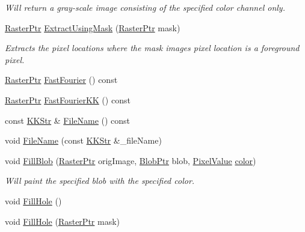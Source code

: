 \begin{DoxyCompactItemize}
\begin{DoxyCompactList}\small\item\em Will return a gray-\/scale image consisting of the specified color channel only. \end{DoxyCompactList}\item 
\hyperlink{class_k_k_b_1_1_raster_aefa532857fd6aa9eb53f79da55a97c5a}{Raster\+Ptr} \hyperlink{class_k_k_b_1_1_raster_a92640499842068eb907e5022ce86fc8c}{Extract\+Using\+Mask} (\hyperlink{class_k_k_b_1_1_raster_aefa532857fd6aa9eb53f79da55a97c5a}{Raster\+Ptr} mask)
\begin{DoxyCompactList}\small\item\em Extracts the pixel locations where the \textquotesingle{}mask\textquotesingle{} images pixel location is a foreground pixel. \end{DoxyCompactList}\item 
\hyperlink{class_k_k_b_1_1_raster_aefa532857fd6aa9eb53f79da55a97c5a}{Raster\+Ptr} \hyperlink{class_k_k_b_1_1_raster_a4a74dade8e36080787196869aec765ac}{Fast\+Fourier} () const 
\item 
\hyperlink{class_k_k_b_1_1_raster_aefa532857fd6aa9eb53f79da55a97c5a}{Raster\+Ptr} \hyperlink{class_k_k_b_1_1_raster_a88808cc3166c4285d93074c408aa8895}{Fast\+Fourier\+KK} () const 
\item 
const \hyperlink{class_k_k_b_1_1_k_k_str}{K\+K\+Str} \& \hyperlink{class_k_k_b_1_1_raster_a847b09bd1487b61bf126d7732f3694f2}{File\+Name} () const 
\item 
void \hyperlink{class_k_k_b_1_1_raster_ab9954a7ba274481a1188494328e22071}{File\+Name} (const \hyperlink{class_k_k_b_1_1_k_k_str}{K\+K\+Str} \&\+\_\+file\+Name)
\item 
void \hyperlink{class_k_k_b_1_1_raster_a0a760739608520ceb59da06ac9ff02d1}{Fill\+Blob} (\hyperlink{class_k_k_b_1_1_raster_aefa532857fd6aa9eb53f79da55a97c5a}{Raster\+Ptr} orig\+Image, \hyperlink{namespace_k_k_b_a4fa91a7788b982654fca9d7319b98cb4}{Blob\+Ptr} blob, \hyperlink{class_k_k_b_1_1_pixel_value}{Pixel\+Value} \hyperlink{class_k_k_b_1_1_raster_a482384d89cc53fa4f36276307c746854}{color})
\begin{DoxyCompactList}\small\item\em Will paint the specified blob with the specified color. \end{DoxyCompactList}\item 
void \hyperlink{class_k_k_b_1_1_raster_a617d427bb2b7094a9d012e63036a66d8}{Fill\+Hole} ()
\item 
void \hyperlink{class_k_k_b_1_1_raster_ab419a5200300c0d6193486db1807d7c3}{Fill\+Hole} (\hyperlink{class_k_k_b_1_1_raster_aefa532857fd6aa9eb53f79da55a97c5a}{Raster\+Ptr} mask)

\end{DoxyCompactItemize}
